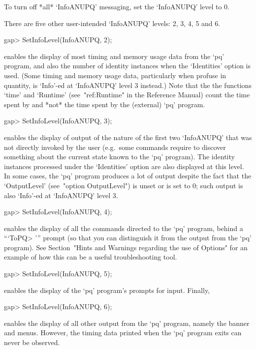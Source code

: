 To turn off *all* `InfoANUPQ' messaging, set the `InfoANUPQ' level to 0.

There are five other user-intended `InfoANUPQ' levels: 2, 3, 4, 5 and 6.

\beginexample
gap> SetInfoLevel(InfoANUPQ, 2);
\endexample

enables the display of most timing and memory usage data  from  the  `pq'
program, and also the number of identity instances when the  `Identities'
option is used. (Some timing and memory  usage  data,  particularly  when
profuse in quantity, is `Info'-ed at `InfoANUPQ' level 3  instead.)  Note
that the the {\GAP} functions `time' and `Runtime' (see~"ref:Runtime"  in
the {\GAP} Reference Manual) count the time spent by {\GAP} and *not* the
time spent by the (external) `pq' program.

\beginexample
gap> SetInfoLevel(InfoANUPQ, 3);
\endexample

enables the display of output of the nature of the first two  `InfoANUPQ'
that was not directly invoked by the  user  (e.g.~some  commands  require
{\GAP} to discover something about the current state known  to  the  `pq'
program). The identity instances processed under the `Identities'  option
are also displayed at  this  level.  In  some  cases,  the  `pq'  program
produces a  lot  of  output  despite  the  fact  that  the  `OutputLevel'
(see~"option OutputLevel") is unset or is set to 0; such output  is  also
`Info'-ed at `InfoANUPQ' level 3.

\beginexample
gap> SetInfoLevel(InfoANUPQ, 4);
\endexample

enables the display of all the commands  directed  to  the  `pq'  program,
behind a ```ToPQ> ''' prompt (so that you can  distinguish  it  from  the
output from the `pq' program). See Section~"Hints and Warnings  regarding
the use of  Options"  for  an  example  of  how  this  can  be  a  useful
troubleshooting tool.

\beginexample
gap> SetInfoLevel(InfoANUPQ, 5);
\endexample

enables the display of the `pq' program's prompts for input. Finally,

\beginexample
gap> SetInfoLevel(InfoANUPQ, 6);
\endexample

enables the display of all other output from the `pq' program, namely  the
banner and menus. However, the timing data printed when the  `pq'  program
exits can never be observed.


